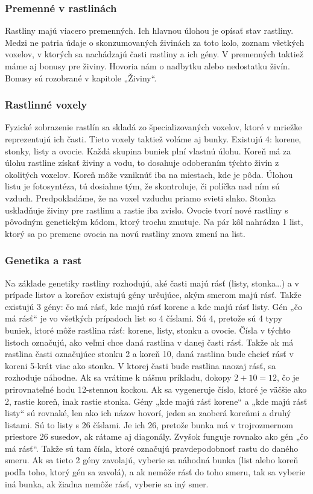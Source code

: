 \documentclass[12pt]{article}
\begin{document}
\subsubsection{Premenné v rastlinách}

Rastliny majú viacero premenných. Ich hlavnou úlohou je opísať stav rastliny.
Medzi ne patria údaje o skonzumovaných živinách za toto kolo, zoznam všetkých
voxelov, v ktorých sa nachádzajú časti rastliny a ich gény. V premenných
taktiež máme aj bonusy pre živiny. Hovoria nám o nadbytku alebo nedostatku
živín. Bonusy sú rozobrané v kapitole „Živiny“.

\subsubsection{Rastlinné voxely}

Fyzické zobrazenie rastlín sa skladá zo špecializovaných voxelov, ktoré
v mriežke reprezentujú ich časti. Tieto voxely taktiež voláme aj bunky.
Existujú 4: korene, stonky, listy a ovocie. Každá skupina buniek plní
vlastnú úlohu. Koreň má za úlohu rastline získať živiny a vodu, to dosahuje
odoberaním týchto živín z okolitých voxelov. Koreň môže vzniknúť iba na
miestach, kde je pôda. Úlohou listu je fotosyntéza, tú dosiahne tým, že
skontroluje, či políčka nad ním sú vzduch. Predpokladáme, že na voxel vzduchu
priamo svieti slnko. Stonka uskladňuje živiny pre rastlinu 
a rastie iba zvislo. Ovocie tvorí nové rastliny
s pôvodným genetickým kódom, ktorý trochu zmutuje. Na pár kôl nahrádza 1 list,
ktorý sa po premene ovocia na novú rastliny znova zmení na list.

\subsubsection{Genetika a rast}

Na základe genetiky rastliny rozhodujú, aké časti majú rásť (listy, stonka…)
a v prípade listov a koreňov existujú gény určujúce, akým smerom majú rásť.
Takže existujú 3 gény: čo má rásť, kde majú rásť korene a kde majú rásť listy.
Gén „čo má rásť“ je vo všetkých prípadoch list so 4 číslami. Sú 4, pretože sú 4
typy buniek, ktoré môže rastlina rásť: korene, listy, stonku a ovocie. Čísla
v týchto listoch označujú, ako veľmi chce daná rastlina v danej časti rásť. Takže
ak má rastlina časti označujúce stonku 2 a koreň 10, daná rastlina bude
chcieť rásť v koreni 5-krát viac ako stonka. V ktorej časti bude rastlina naozaj
rásť, sa rozhoduje náhodne. Ak sa vrátime k nášmu príkladu, dokopy $2+10=12$,
čo je prirovnateľné hodu 12-stennou kockou. Ak sa vygeneruje číslo,
ktoré je väčšie ako 2, rastie koreň, inak rastie stonka. Gény „kde majú rásť korene“
a „kde majú rásť listy“ sú rovnaké, len ako ich názov hovorí, jeden sa zaoberá
koreňmi a druhý listami. Sú to listy s 26 číslami. Je ich 26, pretože bunka má
v trojrozmernom priestore 26 susedov, ak rátame aj diagonály. Zvyšok funguje
rovnako ako gén „čo má rásť“. Takže sú tam čísla, ktoré označujú
pravdepodobnosť rastu do daného smeru. Ak sa tieto 2 gény zavolajú, vyberie
sa náhodná bunka (list alebo koreň podľa toho, ktorý gén sa zavolá), a ak
nemôže rásť do toho smeru, tak sa vyberie iná bunka, ak žiadna nemôže rásť,
vyberie sa iný smer.
\end{document}
